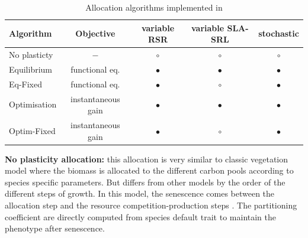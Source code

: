 \begin{table}
\caption{Allocation algorithms implemented in \model} 
\label{table:alloc_algo}
\begin{tabular}{l|c|c c c}
Algorithm & Objective & variable RSR & variable SLA-SRL & stochastic \\ 
\hline 
No plasticty & $-$ & $\circ$ & $\circ$ & $\circ$ \\
Equilibrium & functional eq. & $\bullet$ & $\bullet$ & $\bullet$ \\
Eq-Fixed & functional eq. & $\bullet$ & $\circ$ & $\bullet$ \\
Optimisation & instantaneous gain & $\bullet$ & $\bullet$ & $\bullet$ \\
Optim-Fixed & instantaneous gain & $\bullet$ & $\circ$ & $\bullet$ \\
\end{tabular} 
\vspace*{0.5cm}
\end{table}

\textbf{No plasticity allocation:} this allocation is very similar to classic vegetation model where the biomass is allocated to the different carbon pools according to species specific parameters. But \model differs from other models by the order of the different steps of growth. In this model, the senescence comes between the allocation step and the resource competition-production steps . The partitioning coefficient are directly computed from species default trait to maintain the phenotype after senescence.

